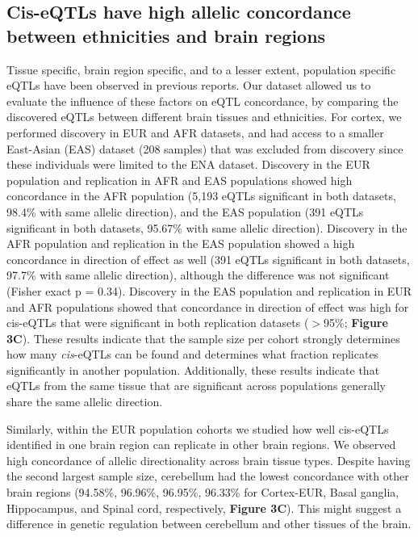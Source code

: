 {{\subsection{Cis-eQTLs have high allelic concordance between ethnicities and brain regions }
Tissue specific\cite{aguetGeneticEffectsGene2017}, brain region specific\cite{siebertsLargeEQTLMetaanalysis2020}, and to a lesser extent, population specific\cite{shangGeneticArchitectureGene2020} eQTLs have been observed in previous reports. Our dataset allowed us to evaluate the influence of these factors on eQTL concordance, by comparing the discovered eQTLs between different brain tissues and ethnicities. For cortex, we performed discovery in EUR and AFR datasets, and had access to a smaller East-Asian (EAS) dataset (208 samples) that was excluded from discovery since these individuals were limited to the ENA dataset. Discovery in the EUR population and replication in AFR and EAS populations showed high concordance in the AFR population (5,193 eQTLs significant in both datasets, 98.4\% with same allelic direction), and the EAS population (391 eQTLs significant in both datasets, 95.67\% with same allelic direction). Discovery in the AFR population and replication in the EAS population showed a high concordance in direction of effect as well (391 eQTLs significant in both datasets, 97.7\% with same allelic direction), although the difference was not significant (Fisher exact p = 0.34). Discovery in the EAS population and replication in EUR and AFR populations showed that concordance in direction of effect was high for cis-eQTLs that were significant in both replication datasets ($>$95\%; \textbf{Figure 3C}). These results indicate that the sample size per cohort strongly determines how many \emph{cis}-eQTLs can be found and determines what fraction replicates significantly in another population. Additionally, these results indicate that eQTLs from the same tissue that are significant across populations generally share the same allelic direction. 

Similarly, within the EUR population cohorts we studied how well cis-eQTLs identified in one brain region can replicate in other brain regions. We observed high concordance of allelic directionality across brain tissue types. Despite having the second largest sample size, cerebellum had the lowest concordance with other brain regions (94.58\%, 96.96\%, 96.95\%, 96.33\% for Cortex-EUR, Basal ganglia, Hippocampus, and Spinal cord, respectively, \textbf{Figure 3C}). This might suggest a difference in genetic regulation between cerebellum and other tissues of the brain.  

}}
